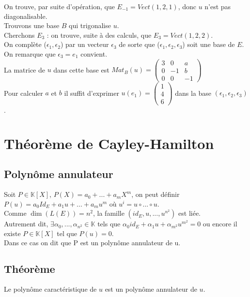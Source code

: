\documentclass[a4paper,10pt]{book} %
\newcommand{\K}{\mathbb{K}}
\begin{document}
On trouve, par suite d'opération, que $E_{-1}=Vect(1,2,1)$, donc $u$ n'est pas diagonalisable.\\

Trouvons une base $B$ qui trigonalise $u$.\\
Cherchons $E_3$ : on trouve, suite à des calculs, que $E_3=Vect(1,2,2)$.\\

On complète ($\epsilon_1,\epsilon_2$) par un vecteur $\epsilon_3$ de sorte que ($\epsilon_1,\epsilon_2,\epsilon_3$) soit une base de $E$.\\

On remarque que $\epsilon_3=e_1$ convient.\\
La matrice de $u$ dans cette base est
$Mat_B(u)=\begin{pmatrix}
3&0&a\\
0&-1&b\\
0&0&-1
\end{pmatrix}$\\

Pour calculer $a$ et $b$ il suffit d'exprimer $u(e_1)=\begin{pmatrix}
1\\4\\6
\end{pmatrix}$ dans la base $(\epsilon_1,\epsilon_2,\epsilon_3)$.

\section{Théorème de Cayley-Hamilton}
\subsection{Polynôme annulateur}
Soit $P\in \K[X]$, $P(X)=a_0+...+a_mX^m$, on peut définir $P(u)=a_0Id_E+a_1u+...+a_mu^m$ où $u^i=u\circ...\circ u$.\\

Comme $\dim(L(E))=n^2$, la famille $(id_E,u,...,u^{n^2})$ est liée.\\

Autrement dit, $\exists \alpha_0,...,\alpha_{n^2}\in \K$ tels que $\alpha_0 id_E+\alpha_1 u+\alpha_{m^2}u^{m^2}=0$ ou encore il existe $P\in \K[X]$ tel que $P(u)=0$.\\

Dans ce cas on dit que P est un polynôme annulateur de u.

\newpage

\subsection{Théorème}
Le polynôme caractéristique de $u$ est un polynôme annulateur de $u$.
\end{document}
